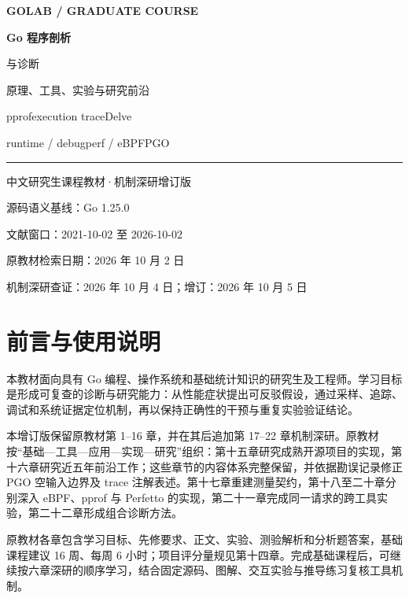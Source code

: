 \documentclass[UTF8,fontset=fandol,openany,11pt]{ctexbook}
\begin{document}
\begin{titlepage}
\pagecolor{mist}\color{ink}
\vspace*{15mm}
{\large\bfseries\color{forest}GOLAB / GRADUATE COURSE\par}
\vspace{24mm}
{\fontsize{34}{44}\selectfont\bfseries Go 程序剖析\par 与诊断\par}
\vspace{8mm}
{\Large 原理、工具、实验与研究前沿\par}
\vspace{20mm}
{\large pprof\quad execution trace\quad Delve\par}
\vspace{4mm}
{\large runtime / debug\quad perf / eBPF\quad PGO\par}
\vfill
\noindent\color{forest}\rule{\linewidth}{1.5pt}\par
\vspace{5mm}
{\large 中文研究生课程教材\quad ·\quad 机制深研增订版\par}
\vspace{4mm}
源码语义基线：Go 1.25.0\par
文献窗口：2021-10-02 至 2026-10-02\par
原教材检索日期：2026 年 10 月 2 日\par
机制深研查证：2026 年 10 月 4 日；增订：2026 年 10 月 5 日\par
\vspace{10mm}
\end{titlepage}
\nopagecolor\color{black}
\frontmatter
\chapter*{前言与使用说明}
本教材面向具有 Go 编程、操作系统和基础统计知识的研究生及工程师。学习目标是形成可复查的诊断与研究能力：从性能症状提出可反驳假设，通过采样、追踪、调试和系统证据定位机制，再以保持正确性的干预与重复实验验证结论。

本增订版保留原教材第 1–16 章，并在其后追加第 17–22 章机制深研。原教材按“基础—工具—应用—实现—研究”组织：第十五章研究成熟开源项目的实现，第十六章研究近五年前沿工作；这些章节的内容体系完整保留，并依据勘误记录修正 PGO 空输入边界及 trace 注解表述。第十七章重建测量契约，第十八至二十章分别深入 eBPF、pprof 与 Perfetto 的实现，第二十一章完成同一请求的跨工具实验，第二十二章形成组合诊断方法。

原教材各章包含学习目标、先修要求、正文、实验、测验解析和分析题答案，基础课程建议 16 周、每周 6 小时；项目评分量规见第十四章。完成基础课程后，可继续按六章深研的顺序学习，结合固定源码、图解、交互实验与推导练习复核工具机制。
\end{document}
